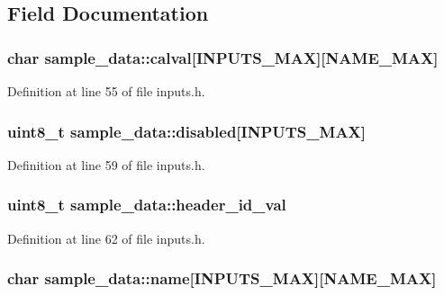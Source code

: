\subsection{Field Documentation}
\hypertarget{structsample__data_ae968c47b8184f1c4f8eac40afcdd40d2}{
\subsubsection[{calval}]{\setlength{\rightskip}{0pt plus 5cm}char sample\-\_\-data\-::calval\mbox{[}{\bf I\-N\-P\-U\-T\-S\-\_\-\-M\-A\-X}\mbox{]}\mbox{[}{\bf N\-A\-M\-E\-\_\-\-M\-A\-X}\mbox{]}}}\label{structsample__data_ae968c47b8184f1c4f8eac40afcdd40d2}


Definition at line 55 of file inputs.\-h.

\hypertarget{structsample__data_a43021cf4232112c0be0deb325252da5d}{
\subsubsection[{disabled}]{\setlength{\rightskip}{0pt plus 5cm}uint8\-\_\-t sample\-\_\-data\-::disabled\mbox{[}{\bf I\-N\-P\-U\-T\-S\-\_\-\-M\-A\-X}\mbox{]}}}\label{structsample__data_a43021cf4232112c0be0deb325252da5d}


Definition at line 59 of file inputs.\-h.

\hypertarget{structsample__data_a4fcbf044732756a32052015ddeed0803}{
\subsubsection[{header\-\_\-id\-\_\-val}]{\setlength{\rightskip}{0pt plus 5cm}uint8\-\_\-t sample\-\_\-data\-::header\-\_\-id\-\_\-val}}\label{structsample__data_a4fcbf044732756a32052015ddeed0803}


Definition at line 62 of file inputs.\-h.

\hypertarget{structsample__data_ad7e5e24f779c9d9683fee404e3b63e21}{
\subsubsection[{name}]{\setlength{\rightskip}{0pt plus 5cm}char sample\-\_\-data\-::name\mbox{[}{\bf I\-N\-P\-U\-T\-S\-\_\-\-M\-A\-X}\mbox{]}\mbox{[}{\bf N\-A\-M\-E\-\_\-\-M\-A\-X}\mbox{]}}}\label{structsample__data_ad7e5e24f779c9d9683fee404e3b63e21}


